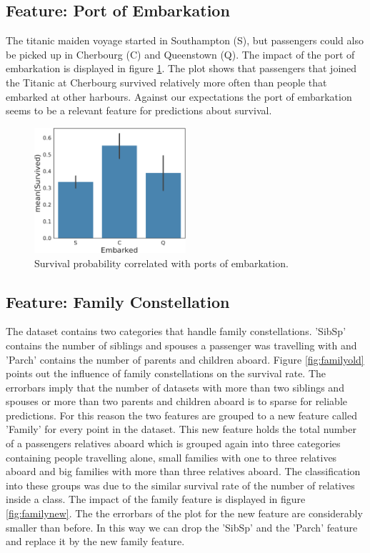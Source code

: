  \subsection{Feature: Port of Embarkation}
 The titanic maiden voyage started in Southampton (S), but passengers could also be picked up in Cherbourg (C) and Queenstown (Q). The impact of the port of embarkation is displayed in figure \ref{fig:embarkationfeat}. The plot shows that passengers that joined the Titanic at Cherbourg survived relatively more often than people that embarked at other harbours. Against our expectations the port of embarkation seems to be a relevant feature for predictions about survival.
 
  \begin{figure}
 \centering
     \includegraphics[width=0.5\textwidth]{media_saved/embarkation_survived}
     \caption{Survival probability correlated with ports of embarkation.}
     \label{fig:embarkationfeat}
 \end{figure}
 
 \subsection{Feature: Family Constellation}
 The dataset contains two categories that handle family constellations. 'SibSp' contains the number of siblings and spouses a passenger was travelling with and 'Parch' contains the number of parents and children aboard. Figure \ref{fig:familyold} points out the influence of family constellations on the survival rate. The errorbars imply that the number of datasets with more than two siblings and spouses or more than two parents and children aboard is to sparse for reliable predictions. For this reason the two features are grouped to a new feature called 'Family' for every point in the dataset. This new feature holds the total number of a passengers relatives aboard which is grouped again into three categories containing people travelling alone, small families with one to three relatives aboard and big families with more than three relatives aboard. The classification into these groups was due to the similar survival rate of the number of relatives inside a class. The impact of the family feature is displayed in figure \ref{fig:familynew}. The the errorbars of the plot for the new feature are considerably smaller than before. In this way we can drop the 'SibSp' and the 'Parch' feature and replace it by the new family feature.
 
